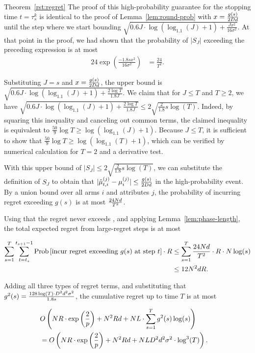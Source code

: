 \begin{extraproof}{Theorem~\ref{rst:regret}}
The proof of this high-probability guarantee for the stopping time
$t = \tau_s^k$ is identical to the proof of
Lemma~\ref{lem:round-prob} with $x = \frac{g(s)}{2 D d}$
until the step where we start bounding
$\sqrt{0.6 J \cdot \log (\log_{1.1}(J) + 1) + \frac{J x^2}{16 \sigma^2}}$.
At that point in the proof, we had shown that 
the probability of $|S_J|$ exceeding the preceding expression is at most
\begin{align*}
24 \exp \left( \frac{-1.8 s x^2}{16 \sigma^2} \right)
  & = \frac{24}{T^2}.
\end{align*}

Substituting $J = s$ and $x = \frac{g(s)}{2 D d}$, the upper bound is
$\sqrt{0.6 J \cdot \log (\log_{1.1}(J) + 1) + \frac{2 \log T}{1.8 J}}$.
We claim that for $J \leq T$ and $T \geq 2$, we have
$\sqrt{0.6 J \cdot \log (\log_{1.1}(J) + 1) + \frac{2 \log T}{1.8 J}}
\leq 2 \sqrt{\frac{2}{1.8} s \log(T)}$.
Indeed, by squaring this inequality and canceling out common terms,
the claimed inequality is equivalent to
$\frac{50}{9} \log T \geq \log(\log_{1.1}(J) + 1)$.
Because $J \leq T$, it is sufficient to show that
$\frac{50}{9} \log T \geq \log(\log_{1.1}(T) + 1)$,
which can be verified by numerical calculation for $T=2$ and a
derivative test.

With this upper bound of $|S_J| \leq 2 \sqrt{\frac{2}{1.8} s \log(T)}$,
we can substitute the definition of $S_J$ to obtain that
$|\hat{\mu}_{t,i}^{(j)} - \mu_{i}^{(j)}| \leq \frac{g(s)}{2D d}$
in the high-probability event.
By a union bound over all arms $i$ and attributes $j$,
the probability of incurring regret exceeding $g(s)$ is at most
$\frac{24 N d}{T^2}$.

Using that the regret never exceeds \MAXR,
and applying Lemma~\ref{lem:phase-length},
the total expected regret from large-regret steps is at most

\begin{align*}
\sum_{s = 1}^T \sum_{t=t_s}^{t_{s+1}-1}
  \Prob{\mbox{incur regret exceeding } g(s) \mbox{ at step } t} \cdot \MAXR
& \leq
 \sum_{s = 1}^T \frac{24 \ARMNUM d}{T^2} \cdot \MAXR \cdot \ARMNUM \log(s)
\\ & \leq 12 \ARMNUM^2 d \MAXR.
\end{align*}

Adding all three types of regret terms,
and substituting that 
$g^2(s) = \frac{128\log(T) \cdot D^2 d^2 \sigma^2}{1.8 s}$,
the cumulative regret up to time $T$ is at most

\begin{align*}
\lefteqn{
O \left(\ARMNUM \MAXR \cdot \exp \left( \frac{2}{p} \right)
+ \ARMNUM^2 \MAXR d
+ \ARMNUM \TieDensity \cdot \sum_{s=1}^{T} g^2(s) \log(s) \right)}
\\ & = 
O \left(\ARMNUM \MAXR \cdot \exp \left( \frac{2}{p} \right)
+ \ARMNUM^2 \MAXR d
+ \ARMNUM \TieDensity \Diam^2 d^2 \sigma^2 \cdot \log^3(T) \right).
\end{align*}
\end{extraproof}
